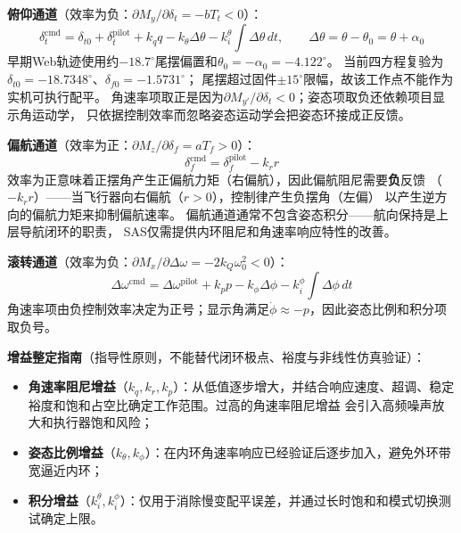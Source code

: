 \textbf{俯仰通道}（效率为负：$\partial M_y / \partial \delta_t = -b T_t < 0$）：
\begin{equation}
    \delta_t^{\text{cmd}} = \delta_{t0}+\delta_t^{\text{pilot}}
    + k_q q - k_\theta \Delta\theta
    - k_i^\theta \int \Delta\theta \, dt,\qquad
    \Delta\theta=\theta-\theta_0=\theta+\alpha_0
    \label{eq:sas_pitch}
\end{equation}
早期Web轨迹使用约$-18.7^\circ$尾摆偏置和$\theta_0=-\alpha_0=-4.122^\circ$。
当前四方程复验为$\delta_{t0}=-18.7348^\circ$、$\delta_{f0}=-1.5731^\circ$；
尾摆超过固件$\pm15^\circ$限幅，故该工作点不能作为实机可执行配平。
角速率项取正是因为$\partial M_{y'}/\partial\delta_t<0$；姿态项取负还依赖项目显示角运动学，
只依据控制效率而忽略姿态运动学会把姿态环接成正反馈。

\textbf{偏航通道}（效率为正：$\partial M_z / \partial \delta_f = a T_f > 0$）：
\begin{equation}
    \delta_f^{\text{cmd}} = \delta_f^{\text{pilot}}
    - k_r r
    \label{eq:sas_yaw}
\end{equation}
效率为正意味着正摆角产生正偏航力矩（右偏航），因此偏航阻尼需要\textbf{负}反馈
（$-k_r r$）——当飞行器向右偏航（$r > 0$），控制律产生负摆角（左偏）
以产生逆方向的偏航力矩来抑制偏航速率。
偏航通道通常不包含姿态积分——航向保持是上层导航闭环的职责，
SAS仅需提供内环阻尼和角速率响应特性的改善。

\textbf{滚转通道}（效率为负：$\partial M_x / \partial \Delta\omega = -2k_Q \omega_0^2 < 0$）：
\begin{equation}
    \Delta\omega^{\text{cmd}} = \Delta\omega^{\text{pilot}}
    + k_p p - k_\phi \Delta\phi
    - k_i^\phi \int \Delta\phi \, dt
    \label{eq:sas_roll}
\end{equation}
角速率项由负控制效率决定为正号；显示角满足$\dot\phi\approx-p$，因此姿态比例和积分项取负号。

\textbf{增益整定指南}（指导性原则，不能替代闭环极点、裕度与非线性仿真验证）：
\begin{itemize}
    \item \textbf{角速率阻尼增益}（$k_q, k_r, k_p$）：从低值逐步增大，并结合响应速度、超调、稳定裕度和饱和占空比确定工作范围。过高的角速率阻尼增益
          会引入高频噪声放大和执行器饱和风险；
    \item \textbf{姿态比例增益}（$k_\theta, k_\phi$）：在内环角速率响应已经验证后逐步加入，避免外环带宽逼近内环；
    \item \textbf{积分增益}（$k_i^\theta, k_i^\phi$）：仅用于消除慢变配平误差，并通过长时饱和和模式切换测试确定上限。
\end{itemize}

